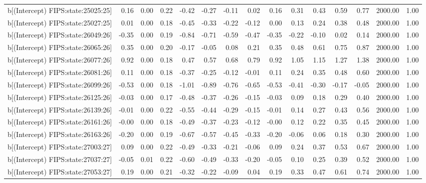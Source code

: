 \begin{table}[ht]
\begin{tabular}{rrrrrrrrrrrrrrr}
  b[(Intercept) FIPS:state:25025:25] & 0.16 & 0.00 & 0.22 & -0.42 & -0.27 & -0.11 & 0.02 & 0.16 & 0.31 & 0.43 & 0.59 & 0.77 & 2000.00 & 1.00 \\ 
  b[(Intercept) FIPS:state:25027:25] & 0.01 & 0.00 & 0.18 & -0.45 & -0.33 & -0.22 & -0.12 & 0.00 & 0.13 & 0.24 & 0.38 & 0.48 & 2000.00 & 1.00 \\ 
  b[(Intercept) FIPS:state:26049:26] & -0.35 & 0.00 & 0.19 & -0.84 & -0.71 & -0.59 & -0.47 & -0.35 & -0.22 & -0.10 & 0.02 & 0.14 & 2000.00 & 1.00 \\ 
  b[(Intercept) FIPS:state:26065:26] & 0.35 & 0.00 & 0.20 & -0.17 & -0.05 & 0.08 & 0.21 & 0.35 & 0.48 & 0.61 & 0.75 & 0.87 & 2000.00 & 1.00 \\ 
  b[(Intercept) FIPS:state:26077:26] & 0.92 & 0.00 & 0.18 & 0.47 & 0.57 & 0.68 & 0.79 & 0.92 & 1.05 & 1.15 & 1.27 & 1.38 & 2000.00 & 1.00 \\ 
  b[(Intercept) FIPS:state:26081:26] & 0.11 & 0.00 & 0.18 & -0.37 & -0.25 & -0.12 & -0.01 & 0.11 & 0.24 & 0.35 & 0.48 & 0.60 & 2000.00 & 1.00 \\ 
  b[(Intercept) FIPS:state:26099:26] & -0.53 & 0.00 & 0.18 & -1.01 & -0.89 & -0.76 & -0.65 & -0.53 & -0.41 & -0.30 & -0.17 & -0.05 & 2000.00 & 1.00 \\ 
  b[(Intercept) FIPS:state:26125:26] & -0.03 & 0.00 & 0.17 & -0.48 & -0.37 & -0.26 & -0.15 & -0.03 & 0.09 & 0.18 & 0.29 & 0.40 & 2000.00 & 1.00 \\ 
  b[(Intercept) FIPS:state:26139:26] & -0.01 & 0.00 & 0.22 & -0.55 & -0.44 & -0.29 & -0.15 & -0.01 & 0.14 & 0.27 & 0.43 & 0.56 & 2000.00 & 1.00 \\ 
  b[(Intercept) FIPS:state:26161:26] & -0.00 & 0.00 & 0.18 & -0.49 & -0.37 & -0.23 & -0.12 & -0.00 & 0.12 & 0.22 & 0.35 & 0.45 & 2000.00 & 1.00 \\ 
  b[(Intercept) FIPS:state:26163:26] & -0.20 & 0.00 & 0.19 & -0.67 & -0.57 & -0.45 & -0.33 & -0.20 & -0.06 & 0.06 & 0.18 & 0.30 & 2000.00 & 1.00 \\ 
  b[(Intercept) FIPS:state:27003:27] & 0.09 & 0.00 & 0.22 & -0.49 & -0.33 & -0.21 & -0.06 & 0.09 & 0.24 & 0.37 & 0.53 & 0.67 & 2000.00 & 1.00 \\ 
  b[(Intercept) FIPS:state:27037:27] & -0.05 & 0.01 & 0.22 & -0.60 & -0.49 & -0.33 & -0.20 & -0.05 & 0.10 & 0.25 & 0.39 & 0.52 & 2000.00 & 1.00 \\ 
  b[(Intercept) FIPS:state:27053:27] & 0.19 & 0.00 & 0.21 & -0.32 & -0.22 & -0.09 & 0.04 & 0.19 & 0.33 & 0.47 & 0.61 & 0.74 & 2000.00 & 1.00 \\ 

\end{tabular}
\end{table}
